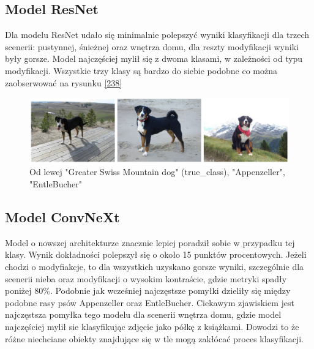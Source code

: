 \subsection*{Model ResNet}

Dla modelu ResNet udało się minimalnie polepszyć wyniki klasyfikacji dla trzech scenerii: pustynnej, śnieżnej oraz wnętrza domu, dla reszty modyfikacji wyniki były gorsze. Model najczęściej mylił się z dwoma klasami, w zależności od typu modyfikacji. Wszystkie trzy klasy są bardzo do siebie
podobne co można zaobserwować na rysunku \ref*{238}  

\begin{figure}
	\centering\includegraphics[width=.9\textwidth]{img/238}
	\caption{Od lewej "Greater Swiss Mountain dog" (true\_class), "Appenzeller", "EntleBucher"}
	\label{rys:238}
\end{figure}

\subsection*{Model ConvNeXt}

Model o nowszej architekturze znacznie lepiej poradził sobie w przypadku tej klasy. Wynik dokładności polepszył się o około 15 punktów procentowych. Jeżeli chodzi o modyfiakcje, to dla wszystkich uzyskano gorsze wyniki, szczególnie dla scenerii nieba oraz modyfikacji o wysokim kontraście, gdzie
metryki spadły poniżej 80\%. Podobnie jak wcześniej najczęstsze pomyłki dzieliły się między podobne rasy psów Appenzeller oraz EntleBucher. Ciekawym zjawiskiem jest najczęstsza pomyłka tego modelu dla scenerii wnętrza domu, gdzie model najczęściej mylił sie klasyfikując zdjęcie jako
półkę z książkami. Dowodzi to że różne niechciane obiekty znajdujące się w tle mogą zakłócać proces klasyfikacji. 

